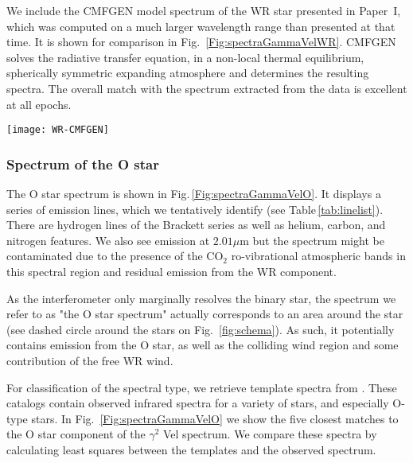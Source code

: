 \documentclass[usenatbib]{mnras}%
\begin{document}
We  include the CMFGEN \citep{1998ApJ...496..407H,2000MNRAS.315..407D} model spectrum of the WR star presented in Paper~I, which was computed on a much larger wavelength range than presented at that time. It is shown for comparison in Fig.~\ref{Fig:spectraGammaVelWR}. CMFGEN solves the radiative transfer equation, in a non-local thermal equilibrium, spherically symmetric expanding atmosphere and determines the resulting spectra. The overall match with the spectrum extracted from the data is excellent at all epochs. 

\begin{figure*}
\centering
\texttt{[image: WR-CMFGEN]}
  \caption{Normalized separated spectra of the WR component of $\gamma^2$ Vel with line identifications (see Fig.\,\ref{Fig:spectraGammaVel} for color-code of the different epoch data), shifted in flux by a constant for easier viewing.  At the bottom, we show the good match to the CMFGEN model spectrum from Paper\,I (black line).}
\label{Fig:spectraGammaVelWR}
\end{figure*}

\subsubsection{Spectrum of the O star}

The O star spectrum  is shown in Fig.\,\ref{Fig:spectraGammaVelO}. It displays a series of emission lines, which we tentatively identify (see Table\,\ref{tab:linelist}). There are hydrogen lines of the Brackett series as well as helium, carbon, and nitrogen features. We also see emission at $2.01\mu$m but the spectrum might be contaminated due to the presence of the CO$_2$ ro-vibrational atmospheric bands in this spectral region and residual  emission from the WR component. 

As the interferometer only marginally resolves the binary star, the spectrum we refer to as "the O star spectrum" actually corresponds to an area around the star (see dashed circle around the stars on Fig.~\ref{fig:schema}). As such, it potentially contains emission from the O star, as well as the colliding wind region and some contribution of the free WR wind. 

For classification of the spectral type, we retrieve template spectra from \citet{1996ApJS..107..281H, 2005ApJS..161..154H}. These catalogs contain observed infrared spectra for a variety of stars, and especially O-type stars. In Fig.~\ref{Fig:spectraGammaVelO} we show the five closest matches to the O star component of the $\gamma^2$ Vel spectrum. We compare these spectra by calculating least squares between the templates and the observed spectrum.
\end{document}
